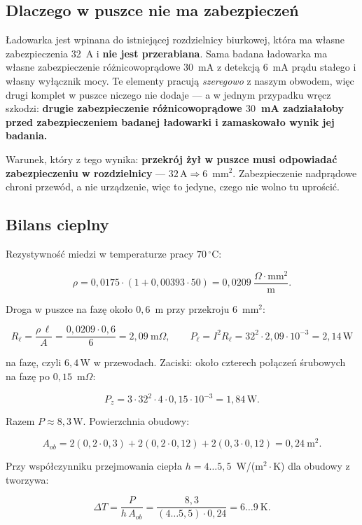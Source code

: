\documentclass[a4paper,11pt]{article}
\newcommand{\amp}{\,\mathrm{A}}
\newcommand{\watt}{\,\mathrm{W}}
\begin{document}
\subsection{Dlaczego w puszce nie ma zabezpieczeń}

Ładowarka jest wpinana do istniejącej rozdzielnicy biurkowej, która ma własne
zabezpieczenia 32~A i \textbf{nie jest przerabiana}. Sama badana ładowarka ma
własne zabezpieczenie różnicowoprądowe $30$~mA z detekcją $6$~mA prądu stałego
i własny wyłącznik mocy. Te elementy pracują \emph{szeregowo} z naszym obwodem,
więc drugi komplet w puszce niczego nie dodaje --- a w jednym przypadku wręcz
szkodzi: \textbf{drugie zabezpieczenie różnicowoprądowe $30$~mA zadziałałoby przed
zabezpieczeniem badanej ładowarki i zamaskowało wynik jej badania.}

Warunek, który z tego wynika: \textbf{przekrój żył w puszce musi odpowiadać
zabezpieczeniu w rozdzielnicy} --- $32\amp \Rightarrow 6$~mm$^2$. Zabezpieczenie
nadprądowe chroni przewód, a nie urządzenie, więc to jedyne, czego nie wolno tu
uprościć.

\subsection{Bilans cieplny}

Rezystywność miedzi w temperaturze pracy $70\,^\circ$C:

\[
\rho = 0{,}0175\cdot\left(1+0{,}00393\cdot50\right)
     = 0{,}0209\ \frac{\Omega\cdot\mathrm{mm}^2}{\mathrm{m}} .
\]

Droga w puszce na fazę około $0{,}6$~m przy przekroju $6$~mm$^2$:

\[
R_{\ell}=\frac{\rho\,\ell}{A}=\frac{0{,}0209\cdot0{,}6}{6}=2{,}09\ \mathrm{m}\Omega,
\qquad
P_{\ell}=I^2R_{\ell}=32^2\cdot2{,}09\cdot10^{-3}=2{,}14\watt
\]

na fazę, czyli $6{,}4\watt$ w przewodach. Zaciski: około czterech połączeń
śrubowych na fazę po $0{,}15$~m$\Omega$:

\[
P_{z}=3\cdot32^2\cdot4\cdot0{,}15\cdot10^{-3}=1{,}84\watt .
\]

Razem $P\approx 8{,}3\watt$. Powierzchnia obudowy:

\[
A_{ob}=2(0{,}2\cdot0{,}3)+2(0{,}2\cdot0{,}12)+2(0{,}3\cdot0{,}12)=0{,}24\ \mathrm{m}^2 .
\]

Przy współczynniku przejmowania ciepła $h=4\ldots5{,}5$~W/(m$^2\cdot$K) dla obudowy
z tworzywa:

\[
\Delta T=\frac{P}{h\,A_{ob}}=\frac{8{,}3}{(4\ldots5{,}5)\cdot0{,}24}=6\ldots9\ \mathrm{K}.
\]
\end{document}
